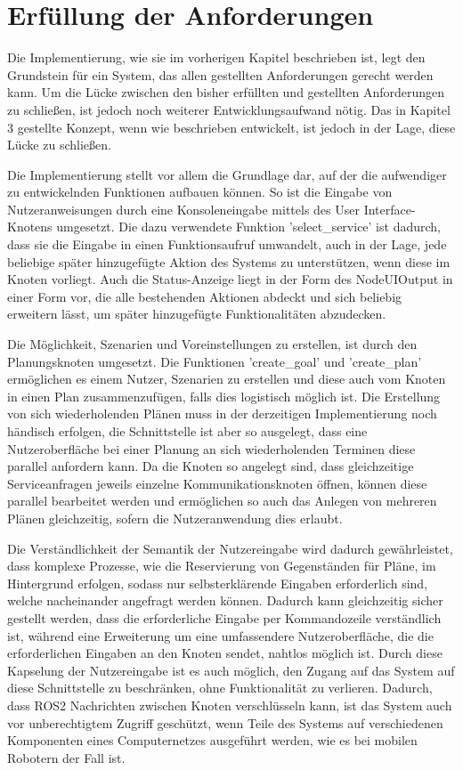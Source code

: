 \section{Erfüllung der Anforderungen}

Die Implementierung, wie sie im vorherigen Kapitel beschrieben ist, legt den Grundstein für ein System, das allen gestellten Anforderungen gerecht werden kann. Um die Lücke zwischen den bisher erfüllten und gestellten Anforderungen zu schließen, ist jedoch noch weiterer Entwicklungsaufwand nötig. Das in Kapitel 3 gestellte Konzept, wenn wie beschrieben entwickelt, ist jedoch in der Lage, diese Lücke zu schließen.

Die Implementierung stellt vor allem die Grundlage dar, auf der die aufwendiger zu entwickelnden Funktionen aufbauen können. So ist die Eingabe von Nutzeranweisungen durch eine Konsoleneingabe mittels des User Interface-Knotens umgesetzt. Die dazu verwendete Funktion 'select\_service' ist dadurch, dass sie die Eingabe in einen Funktionsaufruf umwandelt, auch in der Lage, jede beliebige später hinzugefügte Aktion des Systems zu unterstützen, wenn diese im Knoten vorliegt. Auch die Status-Anzeige liegt in der Form des NodeUIOutput in einer Form vor, die alle bestehenden Aktionen abdeckt und sich beliebig erweitern lässt, um später hinzugefügte Funktionalitäten abzudecken.

Die Möglichkeit, Szenarien und Voreinstellungen zu erstellen, ist durch den Planungsknoten umgesetzt. Die Funktionen 'create\_goal' und 'create\_plan' ermöglichen es einem Nutzer, Szenarien zu erstellen und diese auch vom Knoten in einen Plan zusammenzufügen, falls dies logistisch möglich ist. Die Erstellung von sich wiederholenden Plänen muss in der derzeitigen Implementierung noch händisch erfolgen, die Schnittstelle ist aber so ausgelegt, dass eine Nutzeroberfläche bei einer Planung an sich wiederholenden Terminen diese parallel anfordern kann. Da die Knoten so angelegt sind, dass gleichzeitige Serviceanfragen jeweils einzelne Kommunikationsknoten öffnen, können diese parallel bearbeitet werden und ermöglichen so auch das Anlegen von mehreren Plänen gleichzeitig, sofern die Nutzeranwendung dies erlaubt.

Die Verständlichkeit der Semantik der Nutzereingabe wird dadurch gewährleistet, dass komplexe Prozesse, wie die Reservierung von Gegenständen für Pläne, im Hintergrund erfolgen, sodass nur selbsterklärende Eingaben erforderlich sind, welche nacheinander angefragt werden können. Dadurch kann gleichzeitig sicher gestellt werden, dass die erforderliche Eingabe per Kommandozeile verständlich ist, während eine Erweiterung um eine umfassendere Nutzeroberfläche, die die erforderlichen Eingaben an den Knoten sendet, nahtlos möglich ist. Durch diese Kapselung der Nutzereingabe ist es auch möglich, den Zugang auf das System auf diese Schnittstelle zu beschränken, ohne Funktionalität zu verlieren. Dadurch, dass ROS2 Nachrichten zwischen Knoten verschlüsseln kann, ist das System auch vor unberechtigtem Zugriff geschützt, wenn Teile des Systems auf verschiedenen Komponenten eines Computernetzes ausgeführt werden, wie es bei mobilen Robotern der Fall ist.

